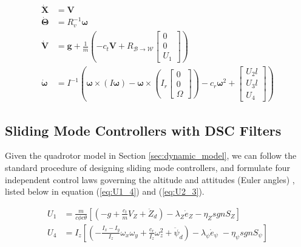 \documentclass[journal,11pt,onecolumn,draftclsnofoot,]{IEEEtran}
\begin{document}
\begin{equation}
\label{eq:state_space_compact}
\begin{split}
\boldsymbol{\dot{X}}&=\boldsymbol{V} \\
\boldsymbol{\dot{\Theta}}&=R_v^{-1}\boldsymbol{\omega} \\
\boldsymbol{\dot{V}}&=\boldsymbol{g}+\frac{1}{m}\left(-c_t\boldsymbol{V}+R_{\mathcal{B}\rightarrow \mathcal{W}}
\begin{bmatrix}
0\\ 0\\ U_1
\end{bmatrix}
\right) \\
\boldsymbol{\dot{\omega}}&=I^{-1} \left(\boldsymbol{\omega}\times \left(I\boldsymbol{\omega}\right)-\boldsymbol{\omega} \times \left(I_r 
\begin{bmatrix}
0\\ 0\\ \Omega
\end{bmatrix}
\right)-c_r \boldsymbol{\omega}^2+ 
\begin{bmatrix}
U_2l \\ U_3l \\ U_4
\end{bmatrix}
\right)
\end{split}
\end{equation}



\subsection{\textbf{Sliding Mode Controllers with DSC Filters}} \label{sliding_controller}

Given the quadrotor model in Section \ref{sec:dynamic_model}, we can follow the standard procedure of designing sliding mode controllers, and formulate four independent control laws governing the altitude and attitudes (Euler angles) \cite{bouadi2011adaptive}, listed below in equation (\ref{eq:U1_4}) and (\ref{eq:U2_3}).

\begin{equation}
\label{eq:U1_4}
\begin{split}
U_1 &=  \frac{m}{c\phi c\theta} \left[ \left( -g+\frac{c_t}{m}V_Z + \ddot{Z}_d \right) - \lambda_Z \dot{e}_Z - \eta_Z sgn S_Z \right] \\
U_4 &=  I_z \left[ \left( -\frac{I_x-I_y}{I_z} \omega_x \omega_y + \frac{c_r}{I_z} \omega_z^2 + \ddot{\psi}_d \right) - \lambda_\psi \dot{e}_\psi\; - \eta_\psi sgn S_\psi \right] \\
\end{split}
\end{equation}
\end{document}
